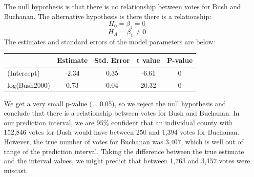 \documentclass[
  letterpaper,
  DIV=11,
  numbers=noendperiod]{scrartcl}
\begin{document}
The null hypothesis is that there is no relationship between votes for
Bush and Buchanan. The alternative hypothesis is there there is a
relationship: \[H_0 = \beta_1 = 0\] \[H_A = \beta_1 \neq 0\] The
estimates and standard errors of the model parameters are below:

\begin{table}[H]
\centering
\begin{tabular}[t]{lcccc}
\toprule
  & Estimate & Std. Error & t value & P-value\\
\midrule
(Intercept) & -2.34 & 0.35 & -6.61 & 0\\
log(Bush2000) & 0.73 & 0.04 & 20.32 & 0\\
\bottomrule
\end{tabular}
\end{table}

We get a very small p-value (\alpha = 0.05), so we reject the null
hypothesis and conclude that there is a relationship between votes for
Bush and Buchanan. In our prediction interval, we are 95\% confident
that an individual county with 152,846 votes for Bush would have between
250 and 1,394 votes for Buchanan. However, the true number of votes for
Buchanan was 3,407, which is well out of range of the prediction
interval. Taking the difference between the true estimate and the
interval values, we might predict that between 1,763 and 3,157 votes
were miscast.
\end{document}
